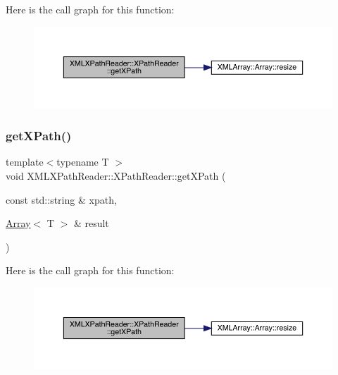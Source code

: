 Here is the call graph for this function\+:
\nopagebreak
\begin{figure}[H]
\begin{center}
\leavevmode
\includegraphics[width=350pt]{d3/d5a/classXMLXPathReader_1_1XPathReader_a2c16b804ab7842a5bab7a8fe3f433437_cgraph}
\end{center}
\end{figure}
\mbox{\label{classXMLXPathReader_1_1XPathReader_a2c16b804ab7842a5bab7a8fe3f433437}} 
\subsubsection{\texorpdfstring{getXPath()}{getXPath()}\hspace{0.1cm}{\footnotesize\ttfamily [6/6]}}
{\footnotesize\ttfamily template$<$typename T $>$ \\
void X\+M\+L\+X\+Path\+Reader\+::\+X\+Path\+Reader\+::get\+X\+Path (\begin{DoxyParamCaption}\item[{const std\+::string \&}]{xpath,  }\item[{\mbox{\hyperlink{classXMLArray_1_1Array}{Array}}$<$ T $>$ \&}]{result }\end{DoxyParamCaption})\hspace{0.3cm}{\ttfamily [inline]}}

Here is the call graph for this function\+:
\nopagebreak
\begin{figure}[H]
\begin{center}
\leavevmode
\includegraphics[width=350pt]{d3/d5a/classXMLXPathReader_1_1XPathReader_a2c16b804ab7842a5bab7a8fe3f433437_cgraph}
\end{center}
\end{figure}
\mbox{\label{classXMLXPathReader_1_1XPathReader_a0a5ca67826c2c8fdad784a3bbbba4b3c}} 
